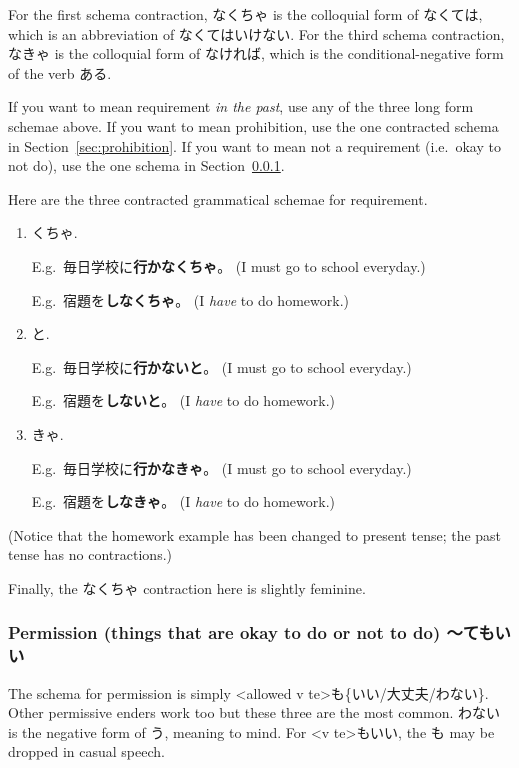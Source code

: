 \documentclass[../nihongo-gakushuu-kyouzai.tex]{subfiles}
\begin{document}
For the first schema contraction, なくちゃ is the colloquial form of なくては, which is an abbreviation of なくてはいけない. For the third schema contraction, なきゃ is the colloquial form of なければ, which is the conditional-negative form of the verb ある. 

 If you want to mean requirement \emph{in the past}, use any of the three long form schemae above. If you want to mean prohibition, use the one contracted schema in Section~\ref{sec:prohibition}. If you want to mean not a requirement (i.e.\ okay to not do), use the one schema in Section~\ref{sec:permission}.

Here are the three contracted grammatical schemae for requirement.
\begin{enumerate}[label=\arabic*.]
    \item <v negative fragment ending in な>くちゃ.

    E.g.\ 毎日学校に\textbf{行かなくちゃ}。 (I must go to school everyday.)

    E.g.\ 宿題を\textbf{しなくちゃ}。 (I \emph{have} to do homework.)
    \item <v negative>と.

    E.g.\ 毎日学校に\textbf{行かないと}。 (I must go to school everyday.)

    E.g.\ 宿題を\textbf{しないと}。 (I \emph{have} to do homework.)

    \item <v negative fragment ending in な>きゃ.

    E.g.\ 毎日学校に\textbf{行かなきゃ}。 (I must go to school everyday.)

    E.g.\ 宿題を\textbf{しなきゃ}。 (I \emph{have} to do homework.)
\end{enumerate}
(Notice that the homework example has been changed to present tense; the past tense has no contractions.)

Finally, the なくちゃ contraction here is slightly feminine.


\subsubsection{Permission (things that are okay to do or not to do) 〜てもいい} \label{sec:permission}
The schema for permission is simply <allowed v te>も\{いい/大丈夫/わない\}. Other permissive enders work too but these three are the most common. わない is the negative form of う, meaning to mind. For <v te>もいい, the も may be dropped in casual speech.
\end{document}
